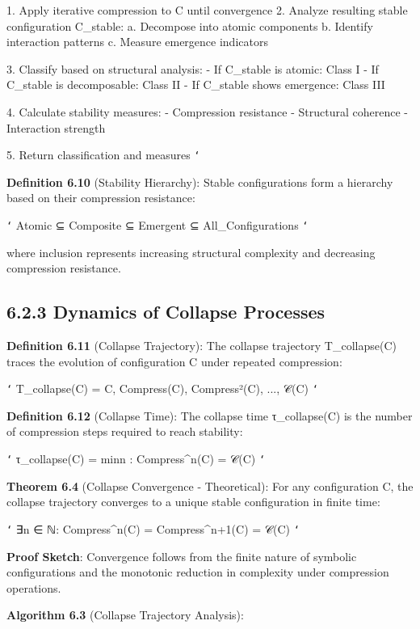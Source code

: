 1. Apply iterative compression to C until convergence
2. Analyze resulting stable configuration C_stable:
   a. Decompose into atomic components
   b. Identify interaction patterns
   c. Measure emergence indicators
   
3. Classify based on structural analysis:
   - If C_stable is atomic: Class I
   - If C_stable is decomposable: Class II  
   - If C_stable shows emergence: Class III
   
4. Calculate stability measures:
   - Compression resistance
   - Structural coherence
   - Interaction strength
   
5. Return classification and measures
\texttt{`}

\textbf{Definition 6.10} (Stability Hierarchy): Stable configurations form a hierarchy based on their compression resistance:

\texttt{`}
Atomic ⊆ Composite ⊆ Emergent ⊆ All_Configurations
\texttt{`}

where inclusion represents increasing structural complexity and decreasing compression resistance.

\subsection{6.2.3 Dynamics of Collapse Processes}

\textbf{Definition 6.11} (Collapse Trajectory): The collapse trajectory T_collapse(C) traces the evolution of configuration C under repeated compression:

\texttt{`}
T_collapse(C) = {C, Compress(C), Compress²(C), ..., 𝒞(C)}
\texttt{`}

\textbf{Definition 6.12} (Collapse Time): The collapse time τ_collapse(C) is the number of compression steps required to reach stability:

\texttt{`}
τ_collapse(C) = min{n : Compress^n(C) = 𝒞(C)}
\texttt{`}

\textbf{Theorem 6.4} (Collapse Convergence - Theoretical): For any configuration C, the collapse trajectory converges to a unique stable configuration in finite time:

\texttt{`}
∃n ∈ ℕ: Compress^n(C) = Compress^{n+1}(C) = 𝒞(C)
\texttt{`}

\textbf{Proof Sketch}: Convergence follows from the finite nature of symbolic configurations and the monotonic reduction in complexity under compression operations.

\textbf{Algorithm 6.3} (Collapse Trajectory Analysis):

